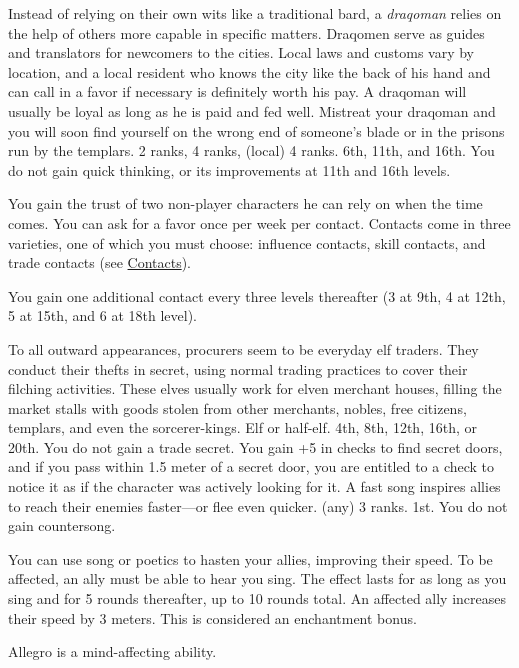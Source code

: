 {Instead of relying on their own wits like a traditional bard, a \emph{draqoman} relies on the help of others more capable in specific matters. Draqomen serve as guides and translators for newcomers to the cities. Local laws and customs vary by location, and a local resident who knows the city like the back of his hand and can call in a favor if necessary is definitely worth his pay. A draqoman will usually be loyal as long as he is paid and fed well. Mistreat your draqoman and you will soon find yourself on the wrong end of someone's blade or in the prisons run by the templars.}
{ 2 ranks,  4 ranks,  (local) 4 ranks.}
{6th, 11th, and 16th.}
{You do not gain quick thinking, or its improvements at 11th and 16th levels.}
{
	You gain the trust of two non-player characters he can rely on when the time comes. You can ask for a favor once per week per contact. Contacts come in three varieties, one of which you must choose: influence contacts, skill contacts, and trade contacts (see \hyperref[sec:contacts]{Contacts}).

	You gain one additional contact every three levels thereafter (3 at 9th, 4 at 12th, 5 at 15th, and 6 at 18th level).
}
{To all outward appearances, procurers seem to be everyday elf traders. They conduct their thefts in secret, using normal trading practices to cover their filching activities. These elves usually work for elven merchant houses, filling the market stalls with goods stolen from other merchants, nobles, free citizens, templars, and even the sorcerer-kings.}
{Elf or half-elf.}
{4th, 8th, 12th, 16th, or 20th.}
{You do not gain a trade secret.}
{
	You gain +5 in  checks to find secret doors, and if you pass within 1.5 meter of a secret door, you are entitled to a  check to notice it as if the character was actively looking for it.
}
{A fast song inspires allies to reach their enemies faster---or flee even quicker.}
{ (any) 3 ranks.}
{1st.}
{You do not gain countersong.}
{
	You can use song or poetics to hasten your allies, improving their speed. To be affected, an ally must be able to hear you sing. The effect lasts for as long as you sing and for 5 rounds thereafter, up to 10 rounds total. An affected ally increases their speed by 3 meters. This is considered an enchantment bonus.

	Allegro is a mind-affecting ability.
}

